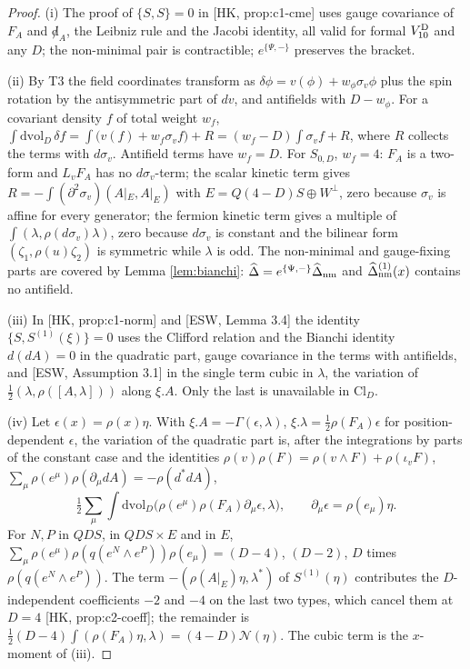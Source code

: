 \documentclass[11pt]{article}
\theoremstyle{definition}
\numberwithin{equation}{section}
\begin{document}
\begin{proof}
(i) The proof of $\{S,S\}=0$ in [HK, prop:c1-cme] uses gauge covariance of $F_A$ and ${\not d}_A$, the Leibniz rule and the Jacobi identity, all valid for formal $V^{\rm D}_{10}$ and any $D$; the non-minimal pair is contractible; $e^{\{\Psi,-\}}$ preserves the bracket.

(ii) By T3 the field coordinates transform as $\delta\phi=v(\phi)+w_\phi\sigma_v\phi$ plus the spin rotation by the antisymmetric part of $dv$, and antifields with $D-w_\phi$. For a covariant density $f$ of total weight $w_f$, $\int\mathrm{dvol}_D\,\delta f=\int\big(v(f)+w_f\sigma_vf\big)+R=(w_f-D)\int\sigma_vf+R$, where $R$ collects the terms with $d\sigma_v$. Antifield terms have $w_f=D$. For $S_{0,D}$, $w_f=4$: $F_A$ is a two-form and $L_vF_A$ has no $d\sigma_v$-term; the scalar kinetic term gives $R=-\int(\partial^2\sigma_v)(A|_E,A|_E)$ with $E=Q(4{-}D)S\oplus W^\perp$, zero because $\sigma_v$ is affine for every generator; the fermion kinetic term gives a multiple of $\int(\lambda,\rho(d\sigma_v)\lambda)$, zero because $d\sigma_v$ is constant and the bilinear form $(\zeta_1,\rho(u)\zeta_2)$ is symmetric while $\lambda$ is odd. The non-minimal and gauge-fixing parts are covered by Lemma \ref{lem:bianchi}: $\widehat\Delta=e^{\{\Psi,-\}}\widehat\Delta_{\rm nm}$ and $\widehat\Delta^{(1)}_{\rm nm}(x)$ contains no antifield.

(iii) In [HK, prop:c1-norm] and [ESW, Lemma 3.4] the identity $\{S,S^{(1)}(\xi)\}=0$ uses the Clifford relation and the Bianchi identity $d(dA)=0$ in the quadratic part, gauge covariance in the terms with antifields, and [ESW, Assumption 3.1] in the single term cubic in $\lambda$, the variation of $\frac12(\lambda,\rho([A,\lambda]))$ along $\xi.A$. Only the last is unavailable in $\mathrm{Cl}_D$.

(iv) Let $\epsilon(x)=\rho(x)\eta$. With $\xi.A=-\Gamma(\epsilon,\lambda)$, $\xi.\lambda=\frac12\rho(F_A)\epsilon$ for position-dependent $\epsilon$, the variation of the quadratic part is, after the integrations by parts of the constant case and the identities $\rho(v)\rho(F)=\rho(v\wedge F)+\rho(\iota_vF)$, $\sum_\mu\rho(e^\mu)\rho(\partial_\mu dA)=-\rho(d^*dA)$,
\[
\tfrac12\sum_\mu\int\mathrm{dvol}_D\big(\rho(e^\mu)\rho(F_A)\partial_\mu\epsilon,\lambda\big),\qquad \partial_\mu\epsilon=\rho(e_\mu)\eta .
\]
For $N,P$ in $QDS$, in $QDS\times E$ and in $E$, $\sum_\mu\rho(e^\mu)\rho(q(e^N\wedge e^P))\rho(e_\mu)=(D-4)$, $(D-2)$, $D$ times $\rho(q(e^N\wedge e^P))$. The term $-(\rho(A|_E)\eta,\lambda^*)$ of $S^{(1)}(\eta)$ contributes the $D$-independent coefficients $-2$ and $-4$ on the last two types, which cancel them at $D=4$ [HK, prop:c2-coeff]; the remainder is $\frac12(D-4)\int(\rho(F_A)\eta,\lambda)=(4-D)\mathcal N(\eta)$. The cubic term is the $x$-moment of (iii).


\end{proof}
\end{document}
